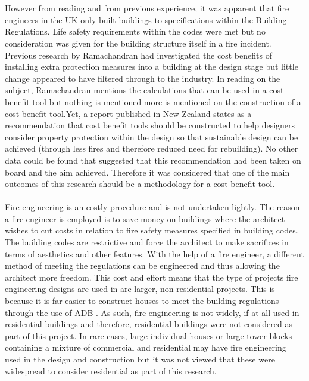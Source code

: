 \documentclass[table,a4paper,oneside]{book}
\begin{document}
\\
\\
However from reading and from previous experience, it was apparent that fire engineers in the UK only built buildings to specifications within the Building Regulations. Life safety requirements within the codes were met but no consideration was given for the building structure itself in a fire incident. Previous research by Ramachandran had investigated the cost benefits of installing extra protection measures into a building at the design stage \citep{Ramachandran1998} but little change appeared to have filtered through to the industry. In reading on the subject, Ramachandran mentions the calculations that can be used in a cost benefit tool but nothing is mentioned more is mentioned on the construction of a cost benefit tool.Yet, a report published in New Zealand \citep{Page2005} states as a recommendation that cost benefit tools should be constructed to help designers consider property protection within the design so that sustainable design can be achieved (through less fires and therefore reduced need for rebuilding). No other data could be found that suggested that this recommendation had been taken on board and the aim achieved. Therefore it was considered that one of the main outcomes of this research should be a methodology for a cost benefit tool.
\\
\\
Fire engineering is an costly procedure and is not undertaken lightly. The reason a fire engineer is employed is to save money on buildings where the architect wishes to cut costs in relation to fire safety measures specified in building codes. The building codes are restrictive and force the architect to make sacrifices in terms of aesthetics and other features. With the help of a fire engineer, a different method of meeting the regulations can be engineered and thus allowing the architect more freedom. This cost and effort means that the type of projects fire engineering designs are used in are larger, non residential projects. This is because it is far easier to construct houses to meet the building regulations through the use of \ac{ADB} \citep{Communities2006}. As such, fire engineering is not widely, if at all used in residential buildings and therefore, residential buildings were not considered as part of this project. In rare cases, large individual houses or large tower blocks containing a mixture of commercial and residential may have fire engineering used in the design and construction but it was not viewed that these were widespread to consider residential as part of this research.
\end{document}
